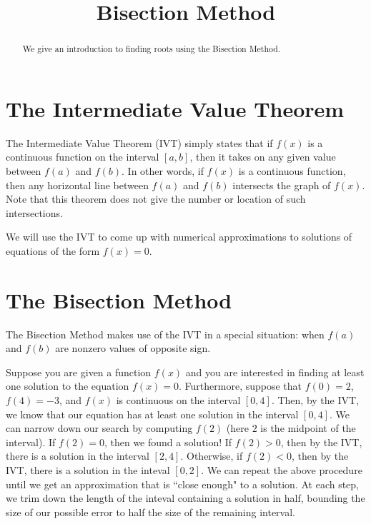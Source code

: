 \documentclass{ximera}
\title{Bisection Method}
\begin{document}
  
\begin{abstract}  
We give an introduction to finding roots using the Bisection Method.
\end{abstract}  
\maketitle

\section{The Intermediate Value Theorem}

The Intermediate Value Theorem (IVT) simply states that if $f(x)$ is a continuous function on the interval $[a,b]$, then it takes on any given value between $f(a)$ and $f(b)$. In other words, if $f(x)$ is a continuous function, then any horizontal line between $f(a)$ and $f(b)$ intersects the graph of $f(x)$. Note that this theorem does not give the number or location of such intersections.


We will use the IVT to come up with numerical approximations to solutions of equations of the form $f(x)=0$. 

\section{The Bisection Method}

The Bisection Method makes use of the IVT in a special situation: when $f(a)$ and $f(b)$ are nonzero values of opposite sign.

Suppose you are given a function $f(x)$ and you are interested in finding at least one solution to the equation $f(x)=0$. Furthermore, suppose that $f(0)=2$, $f(4)=-3$, and $f(x)$ is continuous on the interval $[0,4]$. Then, by the IVT, we know that our equation has at least one solution in the interval $[0,4]$. We can narrow down our search by computing $f(2)$ (here $2$ is the midpoint of the interval). If $f(2)=0$, then we found a solution! If $f(2)>0$, then by the IVT, there is a solution in the interval $[2,4]$. Otherwise, if $f(2)<0$, then by the IVT, there is a solution in the inteval $[0,2]$. We can repeat the above procedure until we get an approximation that is ``close enough" to a solution. At each step, we trim down the length of the inteval containing a solution in half, bounding the size of our possible error to half the size of the remaining interval. 
\end{document}
